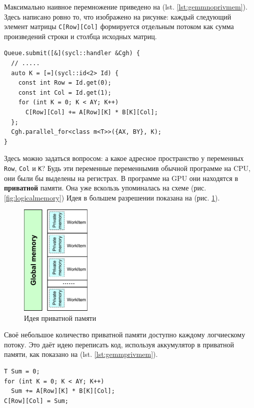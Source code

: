 \documentclass[a4paper,12pt,oneside]{article}
\begin{document}
Максимально наивное перемножение приведено на (lst. \ref{lst:gemmnoprivmem}). Здесь написано ровно то, что изображено на рисунке: каждый следующий элемент матрицы \lstinline!C[Row][Col]! формируется отдельным потоком как сумма произведений строки и столбца исходных матриц.

\begin{lstlisting}[caption={Наивное перемножение матриц без приватной памяти},label={lst:gemmnoprivmem}]
Queue.submit([&](sycl::handler &Cgh) {
  // .....
  auto K = [=](sycl::id<2> Id) {
    const int Row = Id.get(0);
    const int Col = Id.get(1);
    for (int K = 0; K < AY; K++)
      C[Row][Col] += A[Row][K] * B[K][Col];     
  };
  Cgh.parallel_for<class m<T>>({AX, BY}, K);
}
\end{lstlisting}

Здесь можно задаться вопросом: а какое адресное пространство у переменных \lstinline!Row!, \lstinline!Col! и \lstinline!K!?
Будь эти переменные переменнымив  обычной программе на CPU, они были бы выделены на регистрах.
В программе на GPU они находятся в \textbf{приватной} памяти.
Она уже вскользь упоминалась на схеме (рис. \ref{fig:logicalmemory})
Идея в большем разрешении показана на (рис. \ref{fig:privatemem}).

\begin{figure}
\centering
\includegraphics[width=0.3\textwidth]{pictures/sycl-privatemem-shorter.pdf}
\caption{Идея приватной памяти}
\label{fig:privatemem}
\end{figure}

Своё небольшое количество приватной памяти доступно каждому логчиескому потоку.
Это даёт идею переписать код, используя аккумулятор в приватной памяти, как показано на (lst. \ref{lst:gemmprivmem}).

\begin{lstlisting}[caption={Перемножение матриц с использованием приватной памяти},label={lst:gemmprivmem}]
T Sum = 0;
for (int K = 0; K < AY; K++)
  Sum += A[Row][K] * B[K][Col];
C[Row][Col] = Sum;
\end{lstlisting}
\end{document}
